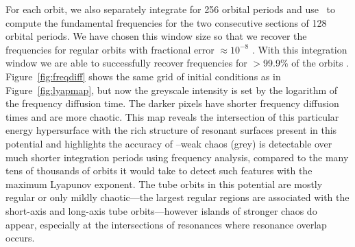 For each orbit, we also separately integrate for 256 orbital periods and use \superfreq\ to compute the fundamental frequencies for the two consecutive sections of 128 orbital periods. We have chosen this window size so that we recover the frequencies for regular orbits with fractional error $\approx10^{-8}$ \citep[we estimate the error in frequency recovery using the method described in][]{laskar93}. With this integration window we are able to successfully recover frequencies for $>$99.9\% of the orbits \superfreq. Figure~\ref{fig:freqdiff} shows the same grid of initial conditions as in Figure~\ref{fig:lyapmap}, but now the greyscale intensity is set by the logarithm of the frequency diffusion time. The darker pixels have shorter frequency diffusion times and are more chaotic. This map reveals the intersection of this particular energy hypersurface with the rich structure of resonant surfaces present in this potential and highlights the accuracy of \superfreq\---weak chaos (grey) is detectable over much shorter integration periods using frequency analysis, compared to the many tens of thousands of orbits it would take to detect such features with the maximum Lyapunov exponent. The tube orbits in this potential are mostly regular or only mildly chaotic---the largest regular regions are associated with the short-axis and long-axis tube orbits---however islands of stronger chaos do appear, especially at the intersections of resonances where resonance overlap occurs. 

